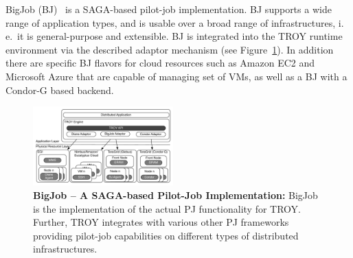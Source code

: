 \documentclass[conference,final]{IEEEtran}
\newcommand{\jhanote}[1]{ {\textcolor{red} { ***shantenu: #1 }}}
\newcommand{\alnote}[1]{ {\textcolor{blue} { ***andre: #1 }}}
\newcommand{\alnote}[1]{}
\newcommand{\jhanote}[1]{}
\begin{document}






BigJob (BJ)~\cite{bigjob_web,saga_bigjob_condor_cloud} is a SAGA-based pilot-job
implementation. BJ supports a wide range of application types, and is usable
over a broad range of infrastructures, i.\,e.\ it is general-purpose and
extensible. BJ is integrated into the TROY runtime environment via the described
adaptor mechanism (see Figure~\ref{fig:figures_distributed_pilot_job}). In
addition there are specific BJ flavors for cloud resources such as Amazon EC2
and Microsoft Azure that are capable of managing set of VMs, as well as a BJ
with a Condor-G based backend. 

\begin{figure}[t]
    \centering
    \includegraphics[width=0.48\textwidth]{figures/distributed_pilot_job.pdf}
    \caption{\textbf{BigJob -- A SAGA-based Pilot-Job Implementation:}
        BigJob is the implementation of the actual PJ functionality
        for TROY. Further, TROY integrates with various other PJ 
        frameworks providing pilot-job capabilities on different types of
        distributed infrastructures.
     }
    \label{fig:figures_distributed_pilot_job}
\end{figure}
\end{document}
